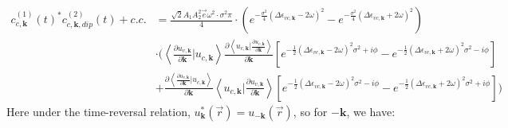 \begin{equation}
\begin{aligned}
    c^{(1)}_{c,\mathbf k}(t)^* c^{(2)}_{c,\mathbf k,dip}(t) +c.c.&=\frac{\sqrt{2}A_1A_2^2 \vec e \omega ^2 \cdot \sigma^2 \pi}{4}\cdot(e^{-\frac{\sigma^2}{4} (\Delta \epsilon_{vc,\mathbf k}-2\omega )^2}-e^{-\frac{\sigma^2}{4} (\Delta \epsilon_{vc,\mathbf k}+2\omega )^2})\\
    &\cdot (\left \langle \frac{\partial u_{v,\mathbf k}}{\partial \mathbf k} |  u_{c,\mathbf k} \right \rangle \frac{\partial{\left \langle u_{c,\mathbf k}\Big |\frac{\partial u_{v,\mathbf k}}{\partial \mathbf k} \right \rangle}}{\partial {\mathbf k}} 
    [e^{-\frac{1}{2}(\Delta \epsilon_{vc,\mathbf k} - 2\omega )^2 \sigma^2+i\phi}
    -e^{-\frac{1}{2}(\Delta \epsilon_{vc,\mathbf k} + 2\omega )^2 \sigma^2-i\phi}]\\
    &+ \frac{\partial{\left \langle \frac{\partial u_{v,\mathbf k}}{\partial \mathbf k} \Big |u_{c,\mathbf k} \right \rangle}}{\partial {\mathbf k}} 
    \left \langle  u_{c,\mathbf k}| \frac{\partial u_{v,\mathbf k}}{\partial \mathbf k} \right \rangle 
    [e^{-\frac{1}{2}(\Delta \epsilon_{vc,\mathbf k} - 2\omega )^2 \sigma^2-i\phi}
    -e^{-\frac{1}{2}(\Delta \epsilon_{vc,\mathbf k} + 2\omega )^2 \sigma^2+i\phi}])
\end{aligned}
\end{equation}
 Here under the time-reversal relation, $u^*_{\mathbf k}(\vec r)= u_{-\mathbf k}(\vec r)$, so for $-\mathbf k$, we have:
 

